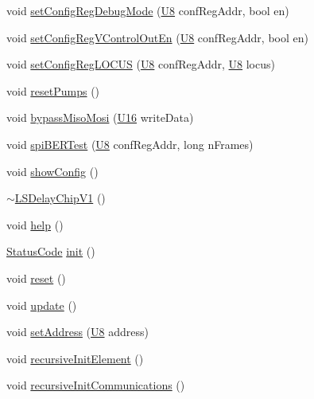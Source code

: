 \begin{DoxyCompactItemize}
void \hyperlink{classLSDelayChipV1_a813eca3585445d504d60a93ec55817f4}{set\+Config\+Reg\+Debug\+Mode} (\hyperlink{ICECALv3_8h_a3cb25ca6f51f003950f9625ff05536fc}{U8} conf\+Reg\+Addr, bool en)
\item 
void \hyperlink{classLSDelayChipV1_afd8a57dda2cd6a62607cbfc9808c3220}{set\+Config\+Reg\+V\+Control\+Out\+En} (\hyperlink{ICECALv3_8h_a3cb25ca6f51f003950f9625ff05536fc}{U8} conf\+Reg\+Addr, bool en)
\item 
void \hyperlink{classLSDelayChipV1_a2a1eebeacb7ed2b0fc5584f3630d0aa0}{set\+Config\+Reg\+L\+O\+C\+US} (\hyperlink{ICECALv3_8h_a3cb25ca6f51f003950f9625ff05536fc}{U8} conf\+Reg\+Addr, \hyperlink{ICECALv3_8h_a3cb25ca6f51f003950f9625ff05536fc}{U8} locus)
\item 
void \hyperlink{classLSDelayChipV1_a5b2c2e527b044b128306695828e9fd19}{reset\+Pumps} ()
\item 
void \hyperlink{classLSDelayChipV1_a9e04b654e8d6d63efe23fc3b31e15ce6}{bypass\+Miso\+Mosi} (\hyperlink{ICECALv3_8h_adf928e51a60dba0df29d615401cc55a8}{U16} write\+Data)
\item 
void \hyperlink{classLSDelayChipV1_ad0ed8d0797c985d7595fbe56f0da1996}{spi\+B\+E\+R\+Test} (\hyperlink{ICECALv3_8h_a3cb25ca6f51f003950f9625ff05536fc}{U8} conf\+Reg\+Addr, long n\+Frames)
\item 
void \hyperlink{classLSDelayChipV1_a01c1e85ae0d0e031164fe2d47b4f4824}{show\+Config} ()
\item 
\hyperlink{classLSDelayChipV1_a86c96f60b9be6f35745536df46919817}{$\sim$\+L\+S\+Delay\+Chip\+V1} ()
\item 
void \hyperlink{classLSDelayChipV1_a3d57457a70f7d42687197704321b0c8e}{help} ()
\item 
\hyperlink{classStatusCode}{Status\+Code} \hyperlink{classLSDelayChipV1_af8bc9c84a1b65cbc2176fdbc349e829c}{init} ()
\item 
void \hyperlink{classLSDelayChipV1_a6b772084a850e96b2f9bb5600c29259c}{reset} ()
\item 
void \hyperlink{classLSDelayChipV1_a7d4eb6fb7ca527286d36f30123bfd60a}{update} ()
\item 
void \hyperlink{classLSDelayChipV1_a04ec44c79258fd22f7d2d5ea27a67648}{set\+Address} (\hyperlink{ICECALv3_8h_a3cb25ca6f51f003950f9625ff05536fc}{U8} address)
\item 
void \hyperlink{classElement_a3c0abcb36f8906688bb7e32608df7086}{recursive\+Init\+Element} ()
\item 
void \hyperlink{classElement_a82119ed37dff76508a2746a853ec35ba}{recursive\+Init\+Communications} ()

\end{DoxyCompactItemize}
